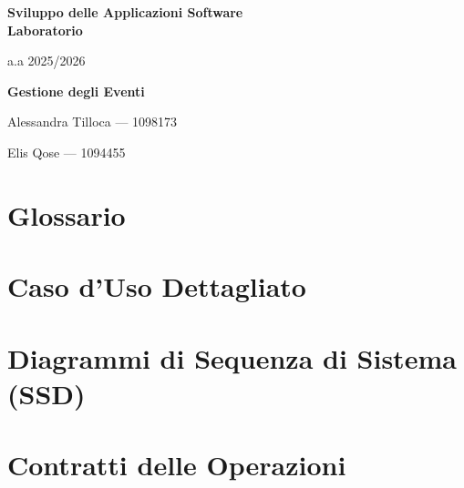 \documentclass[a4paper,11pt]{report}
\begin{document}
\begin{titlepage}
  \centering
  \vspace*{2cm}
  {\huge\bfseries Sviluppo delle Applicazioni Software\\Laboratorio\par}
  \vspace{0.5cm}
  {\LARGE a.a 2025/2026\par}
  \vspace{2cm}
  {\LARGE\bfseries Gestione degli Eventi\par}
  \vfill
  {\LARGE Alessandra Tilloca --- 1098173\par}
  \vspace{0.3cm}
  {\LARGE Elis Qose --- 1094455\par}
  \vfill
\end{titlepage}

\chapter{Glossario}


\chapter{Caso d'Uso Dettagliato}




\chapter{Diagrammi di Sequenza di Sistema (SSD)}


\chapter{Contratti delle Operazioni}





\end{document}
